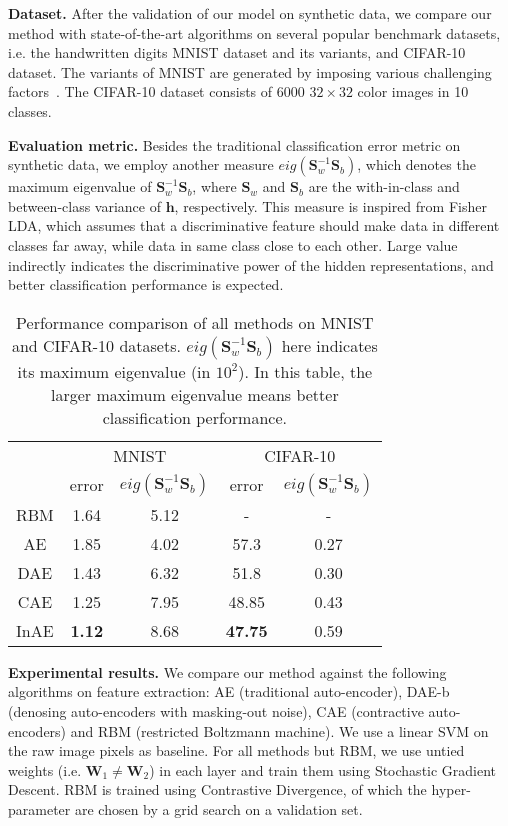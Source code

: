 \documentclass{article}
\def \h{\mathbf h}
\def \SSS{\mathbf S}
\def \W{\mathbf W}
\begin{document}
{\bf Dataset.}
After the validation of our model on synthetic data,
we compare our method with state-of-the-art algorithms on several popular benchmark datasets,
i.e. the handwritten digits MNIST dataset and its variants, and CIFAR-10 dataset.
The variants of MNIST are generated by imposing various challenging factors~\cite{larochelle2007empirical}.
The CIFAR-10 dataset consists of 6000 $32\times32$ color images in 10 classes.

{\bf Evaluation metric.}
Besides the traditional classification error metric on synthetic data,
we employ another measure $eig(\SSS^{-1}_w\SSS_b)$,
which denotes the maximum eigenvalue of $\SSS^{-1}_w\SSS_b$,
where $\SSS_w$ and $\SSS_b$ are the with-in-class and between-class variance of $\h$, respectively.
This measure is inspired from Fisher LDA,
which assumes that
a discriminative feature should make data in different classes far away,
while data in same class close to each other.
Large value indirectly indicates the discriminative power of the hidden representations,
and better classification performance is expected.

\begin{table}[h]
\caption{Performance comparison of all methods on MNIST and CIFAR-10 datasets.
$eig(\SSS_w^{-1}\SSS_b)$ here indicates its maximum eigenvalue (in $10^2$).
In this table,
the larger maximum eigenvalue means better classification performance.}
\begin{center}
\begin{tabular}{c|c|c|c|c|}
\cline{2-5}
& \multicolumn{2}{|c|}{MNIST} & \multicolumn{2}{c|}{CIFAR-10} \\
\cline{2-5}
& error & $eig(\SSS_w^{-1}\SSS_b)$ & error & $eig(\SSS_w^{-1}\SSS_b)$ \\
\hline
\cline{1-5}
\multicolumn{1}{|c|}{RBM} & 1.64 & 5.12 & - & - \\
\cline{1-5}
\multicolumn{1}{|c|}{AE} & 1.85 & 4.02 & 57.3 & 0.27 \\
\cline{1-5}
\multicolumn{1}{|c|}{DAE} & 1.43 & 6.32 & 51.8 & 0.30 \\
\cline{1-5}
\multicolumn{1}{|c|}{CAE} & 1.25 & 7.95 & 48.85 & 0.43 \\
\cline{1-5}
\multicolumn{1}{|c|}{InAE} & \textbf{1.12} & 8.68 & \textbf{47.75} & 0.59 \\
\cline{1-5}
\end{tabular}
\end{center}
\label{tab:aa}
\end{table}

{\bf Experimental results.}
We compare our method against the following algorithms on feature extraction:
AE (traditional auto-encoder),
DAE-b (denosing auto-encoders with masking-out noise),
CAE (contractive auto-encoders)
and RBM (restricted Boltzmann machine).
We use a linear SVM on the raw image pixels as baseline.
For all methods but RBM,
we use untied weights (i.e. $\W_1\neq\W_2$) in each layer
and train them using Stochastic Gradient Descent.
RBM is trained using Contrastive Divergence,
of which the hyper-parameter are chosen by a grid search on a validation set.
\end{document}
